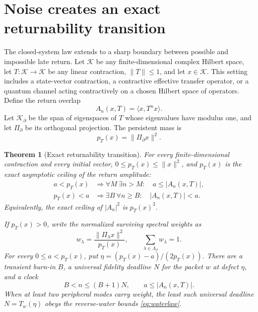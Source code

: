 \documentclass[10pt]{article}
\newtheorem{theorem}{Theorem}
\theoremstyle{definition}
\begin{document}
\section*{Noise creates an exact returnability transition}

The closed-system law extends to a sharp boundary between possible and
impossible late return.  Let \(\mathcal K\) be any finite-dimensional complex
Hilbert space, let \(T:\mathcal K\to\mathcal K\) be any linear contraction,
\(\|T\|\leq1\), and let \(x\in\mathcal K\).  This setting includes a
state-vector contraction, a contractive effective transfer operator, or a
quantum channel acting contractively on a chosen Hilbert space of operators.
Define the return overlap
\[
 A_n(x,T)=\langle x,T^n x\rangle.
\]
Let \(\mathcal K_{\partial}\) be the span of eigenspaces of \(T\) whose
eigenvalues have modulus one, and let \(\Pi_{\partial}\) be its orthogonal
projection.  The persistent mass is
\begin{equation}
 p_T(x)=\|\Pi_{\partial}x\|^2.
\label{eq:persistent-mass}
\end{equation}

\begin{theorem}[Exact returnability transition]
\label{thm:transition}
For every finite-dimensional contraction and every initial vector,
\(0\leq p_T(x)\leq\|x\|^2\), and \(p_T(x)\) is the exact asymptotic ceiling of
the return amplitude:
\begin{align}
 a<p_T(x)&\Longrightarrow
   \forall M\ \exists n>M:\quad a\leq |A_n(x,T)|,
 \label{eq:below-ceiling}\\
 p_T(x)<a&\Longrightarrow
   \exists B\ \forall n\geq B:\quad |A_n(x,T)|<a.
 \label{eq:above-ceiling}
\end{align}
Equivalently, the exact ceiling of \(|A_n|^2\) is \(p_T(x)^2\).

If \(p_T(x)>0\), write the normalized surviving spectral weights as
\[
 w_\lambda=\frac{\|\Pi_\lambda x\|^2}{p_T(x)},\qquad
 \sum_{\lambda\in\Lambda_\partial}w_\lambda=1.
\]
For every \(0\leq a<p_T(x)\), put
\(\eta=(p_T(x)-a)/(2p_T(x))\).  There are a transient burn-in \(B\), a
universal fidelity deadline \(N\) for the packet \(w\) at defect \(\eta\),
and a clock
\begin{equation}
 B<n\leq(B+1)N,\qquad a\leq |A_n(x,T)|.
\label{eq:contractive-deadline}
\end{equation}
When at least two peripheral modes carry weight, the least such universal
deadline \(N=T_w(\eta)\) obeys the reverse-water bounds
\eqref{eq:waterlaw}.
\end{theorem}
\end{document}
